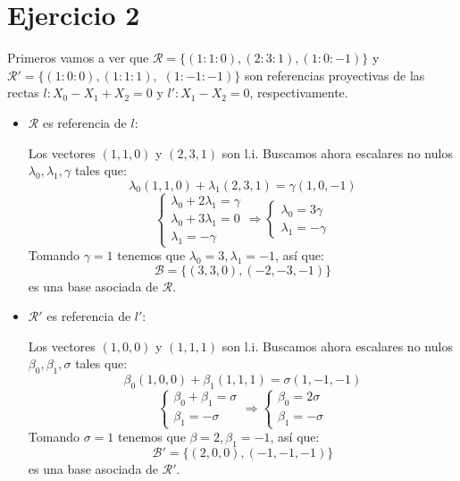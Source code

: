 \documentclass[10pt,a4paper,openright]{book}
\theoremstyle{break}
\begin{document}
\section{Ejercicio 2}%
\label{sec:ejercicio_2_3}
Primeros vamos a ver que $\mathcal{R} = \{\left( 1 : 1 : 0 \right), \left( 2 : 3 : 1 \right), \left( 1 : 0 : -1 \right)\}$ y $\mathcal{R}' = \{\left( 1 : 0 : 0 \right), \left(1 : 1 : 1 \right),$ $\left( 1 : -1 : -1 \right)\}$ son referencias proyectivas de las rectas $l : X_0 - X_1 + X_2 = 0$ y $l' : X_1 - X_2 = 0$, respectivamente.

\begin{itemize}
    \item $\mathcal{R}$ es referencia de $l$:

    Los vectores $\left( 1, 1, 0 \right)$ y $\left( 2, 3, 1 \right)$ son l.i. Buscamos ahora escalares no nulos $\lambda_0, \lambda_1, \gamma$ tales que:
    \[
    \lambda_0\left( 1, 1, 0 \right) + \lambda_1\left( 2, 3, 1 \right) = \gamma\left( 1, 0, -1 \right) 
    \]\[
    \begin{cases}
        \lambda_0 + 2\lambda_1 = \gamma\\
        \lambda_0 + 3\lambda_1 = 0\\
        \lambda_1 = -\gamma
    \end{cases} \Rightarrow \begin{cases}
        \lambda_0 = 3\gamma\\
        \lambda_1 = -\gamma
    \end{cases} 
    \]
    Tomando $\gamma = 1$ tenemos que $\lambda_0 = 3, \lambda_1 = -1$, así que:
    \[
    \mathcal{B} = \{\left( 3, 3, 0 \right), \left( -2, -3, -1 \right)\} 
    \] es una base asociada de $\mathcal{R}$.

    \item $\mathcal{R}'$ es referencia de $l'$:

    Los vectores $\left( 1, 0, 0 \right)$ y $\left( 1, 1, 1 \right)$ son l.i. Buscamos ahora escalares no nulos $\beta_0, \beta_1, \sigma$ tales que:
    \[
    \beta_0\left( 1, 0, 0 \right) + \beta_1\left( 1, 1, 1 \right) = \sigma\left( 1, -1, -1 \right) 
    \]\[
    \begin{cases}
        \beta_0+ \beta_1= \sigma\\
        \beta_1 = -\sigma
    \end{cases} \Rightarrow \begin{cases}
        \beta_0 = 2\sigma\\
        \beta_1 = -\sigma
    \end{cases} 
    \]
    Tomando $\sigma = 1$ tenemos que $\beta = 2, \beta_1 = -1$, así que:
    \[
    \mathcal{B}' = \{\left( 2, 0, 0 \right), \left( -1, -1, -1 \right)\} 
    \] es una base asociada de $\mathcal{R}'$.
\end{itemize}
\end{document}
